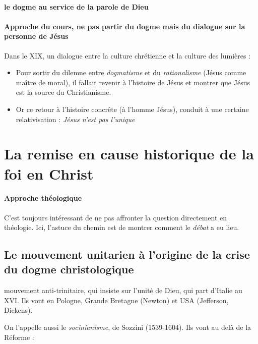 \paragraph{le dogme au service de la parole de Dieu}

\paragraph{Approche du cours, ne pas partir du dogme mais du dialogue sur la personne de Jésus} Dans le XIX, un dialogue entre la culture chrétienne et la culture des lumières : 
\begin{itemize}
    \item Pour sortir du dilemne entre \textit{dogmatisme} et du \textit{rationalisme} (Jésus comme maître de moral), il fallait revenir à l'histoire de Jésus et montrer que Jésus est la source du Christianisme.

    \item Or ce retour à l'histoire concrête (à l'homme Jésus), conduit à une certaine relativisation : \textit{Jésus n'est pas l'unique}
\end{itemize}





\section{La remise en cause historique de la foi en Christ}

\paragraph{Approche théologique} C'est toujours intéressant de ne pas affronter la question directement en théologie. Ici, l'astuce du chemin est de montrer comment le \textit{débat} a eu lieu.


\subsection{Le mouvement unitarien à l’origine de la crise du dogme christologique}

\begin{Def}[Unitarien]
mouvement anti-trinitaire, qui insiste sur l'unité de Dieu, qui part d'Italie au XVI. Ils vont en Pologne, Grande Bretagne (Newton) et USA (Jefferson, Dickens).
\end{Def}
On l'appelle aussi le \textit{socinianisme}, de Sozzini (1539-1604). 
Ils vont au delà de la Réforme : 

